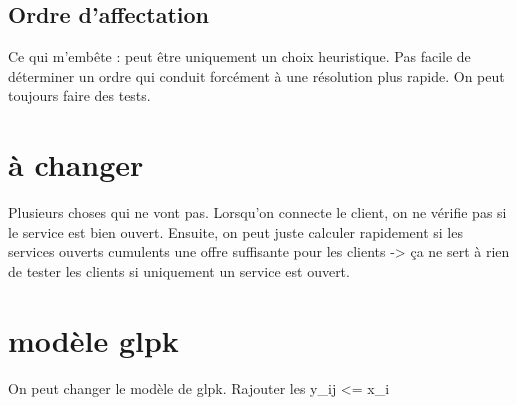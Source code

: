 \subsection{Ordre d'affectation}

Ce qui m'embête : peut être uniquement un choix heuristique. Pas facile de déterminer un ordre qui conduit forcément à une résolution plus rapide.
On peut toujours faire des tests.

\section{à changer}

Plusieurs choses qui ne vont pas. Lorsqu'on connecte le client, on ne vérifie pas si le service est bien ouvert.
Ensuite, on peut juste calculer rapidement si les services ouverts cumulents une offre suffisante pour les clients -> ça ne sert à rien de tester les clients si uniquement un service est ouvert.

\section{modèle glpk}

On peut changer le modèle de glpk. Rajouter les y_ij <= x_i
